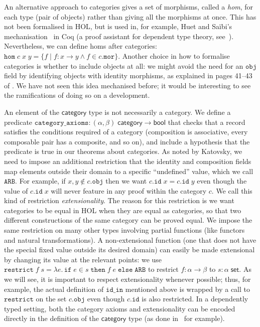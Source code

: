 \documentclass[twoside,titlepage,11pt]{article}
\begin{document}
An alternative approach to categories gives a set of morphisms, called a \emph{hom}, for each type (pair of objects) rather than giving all the morphisms at once.
This has not been formalised in HOL, but is used in, for example, Huet and Sa{\"i}bi's mechanisation~\cite{DBLP:conf/birthday/HuetS00} in Coq (a proof assistant for dependent type theory, see~\cite{DBLP:conf/tphol/Bertot08}).
Nevertheless, we can define homs after categories: $\mathtt{hom}\;c\;x\;y=\{f\mid f:x\to y\land f\in c.\mathtt{mor}\}$.
Another choice in how to formalise categories is whether to include objects at all: we might avoid the need for an $\mathtt{obj}$ field by identifying objects with identity morphisms, as explained in pages 41--43 of \cite{DBLP:books/daglib/0023249}.
We have not seen this idea mechanised before; it would be interesting to see the ramifications of doing so on a development.

An element of the $\mathsf{category}$ type is not necessarily a category.
We define a predicate $\mathtt{category\_axioms}:(\alpha,\beta)\;\mathsf{category}\to\mathsf{bool}$ that checks that a record satisfies the conditions required of a category (composition is associative, every composable pair has a composite, and so on), and include a hypothesis that the predicate is true in our theorems about categories.
As noted by Katovsky, we need to impose an additional restriction that the identity and composition fields map elements outside their domain to a specific ``undefined'' value, which we call $\mathtt{ARB}$.
For example, if $x,y\notin c.\mathtt{obj}$ then we want $c.\mathtt{id}\;x=c.\mathtt{id}\;y$ even though the value of $c.\mathtt{id}\;x$ will never feature in any proof within the category $c$.
We call this kind of restriction \emph{extensionality}.
The reason for this restriction is we want categories to be equal in HOL when they are equal as categories, so that two different constructions of the same category can be proved equal.
We impose the same restriction on many other types involving partial functions (like functors and natural transformations).
A non-extensional function (one that does not have the special fixed value outside its desired domain) can easily be made extensional by changing its value at the relevant points: we use $\mathtt{restrict}\;f\;s=\lambda{e}.\,\mathtt{if}\;e\in s\;\mathtt{then}\;f\;e\;\mathtt{else}\;\mathtt{ARB}$ to restrict $f:\alpha\to\beta$ to $s:\alpha\;\mathsf{set}$.
As we will see, it is important to respect extensionality whenever possible; thus, for example, the actual definition of $\mathtt{id\_in}$ mentioned above is wrapped by a call to $\mathtt{restrict}$ on the set $c.\mathtt{obj}$ even though $c.\mathtt{id}$ is also restricted.
In a dependently typed setting, both the category axioms and extensionality can be encoded directly in the definition of the $\mathsf{category}$ type (as done in~\cite{DBLP:conf/birthday/HuetS00,Sozeau,Megacz} for example).
\end{document}
